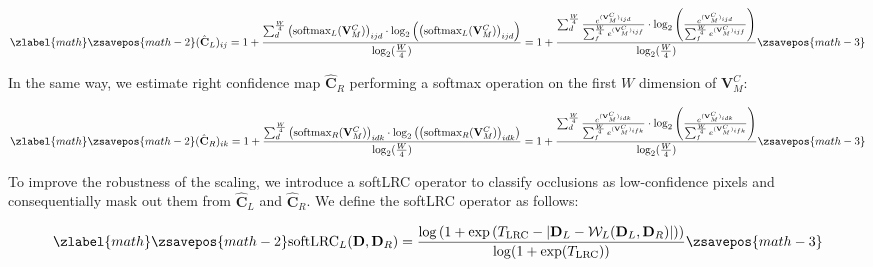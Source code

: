 \documentclass[10pt,twocolumn,letterpaper]{article}
\begin{document}
\small

\begin{equation}
\zlabel{math}
    \zsavepos{math-2}
    (\hat{\mathbf{C}}_L)_{ij} = 1  + \frac{\sum_{d}^{\frac{W}{4}} \left(\text{softmax}_L(\mathbf{V}_M^C)\right)_{ijd} \cdot \log_2 \left( \left(\text{softmax}_L(\mathbf{V}_M^C)\right)_{ijd} \right)}{\log_2(\frac{W}{4})} = 1  + \frac{\sum_{d}^{\frac{W}{4}} \frac{e^{(\mathbf{V}^C_M)_{ijd}}}{\sum_{f}^{\frac{W}{4}} e^{(\mathbf{V}^C_M)_{ijf}}} \cdot \log_2 \left( \frac{e^{(\mathbf{V}^C_M)_{ijd}}}{\sum_{f}^{\frac{W}{4}} e^{(\mathbf{V}^C_M)_{ijf}}} \right)}{\log_2(\frac{W}{4})}
    \label{eq:confidence_left2}
    \zsavepos{math-3}\end{equation}

\normalsize

In the same way, we estimate right confidence map $\hat{\mathbf{C}}_R$ performing a softmax operation on the first $W$ dimension of $\mathbf{V}^C_M$:

\small

\begin{equation}
\zlabel{math}
    \zsavepos{math-2}
    (\hat{\mathbf{C}}_R)_{ik} = 1  + \frac{\sum_{d}^{\frac{W}{4}} \left(\text{softmax}_R(\mathbf{V}_M^C)\right)_{idk} \cdot \log_2 \left( \left(\text{softmax}_R(\mathbf{V}_M^C)\right)_{idk} \right)}{\log_2(\frac{W}{4})} = 1 + \frac{\sum_{d}^{\frac{W}{4}} \frac{e^{(\mathbf{V}^C_M)_{idk}}}{\sum_{f}^{\frac{W}{4}} e^{(\mathbf{V}^C_M)_{ifk}}} \cdot \log_2 \left( \frac{e^{(\mathbf{V}^C_M)_{idk}}}{\sum_{f}^{\frac{W}{4}} e^{(\mathbf{V}^C_M)_{ifk}}} \right)}{\log_2(\frac{W}{4})}
    \label{eq:confidence_right}
    \zsavepos{math-3}\end{equation}

\normalsize

To improve the robustness of the scaling, we introduce a softLRC operator to classify occlusions as low-confidence pixels and consequentially mask out them from $\hat{\mathbf{C}}_L$ and $\hat{\mathbf{C}}_R$.
We define the softLRC operator as follows:

\small

\begin{equation}
\zlabel{math}
    \zsavepos{math-2}
    \text{softLRC}_L(\mathbf{D},\mathbf{D}_R) = \frac{\log\left(1+\exp\left(T_\text{LRC}-\left| \mathbf{D}_L - \mathcal{W}_L(\mathbf{D}_L,\mathbf{D}_R) \right|\right)\right)}{\log(1+\exp(T_\text{LRC}))}
    \label{eq:softlrc}
    \zsavepos{math-3}\end{equation}
\end{document}
